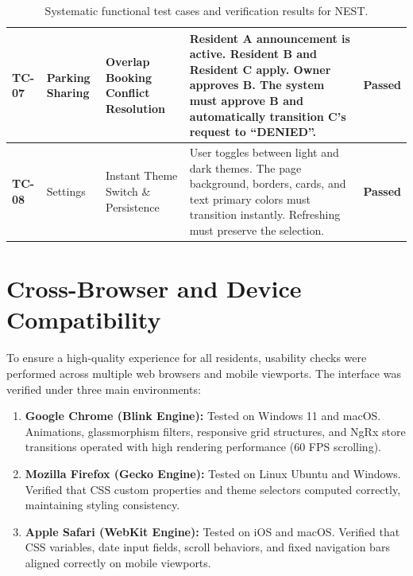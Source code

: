 \begin{table}[htbp]
\begin{tabularx}{\textwidth}{|>{\raggedright\arraybackslash}p{1.0cm}|>{\raggedright\arraybackslash}p{1.8cm}|>{\raggedright\arraybackslash}p{2.8cm}|>{\raggedright\arraybackslash}X|p{1.0cm}|}
\textbf{TC-07} & Parking Sharing & Overlap Booking Conflict Resolution & Resident A announcement is active. Resident B and Resident C apply. Owner approves B. The system must approve B and automatically transition C's request to ``DENIED''. & \textbf{Passed} \\ \hline
\textbf{TC-08} & Settings & Instant Theme Switch \& Persistence & User toggles between light and dark themes. The page background, borders, cards, and text primary colors must transition instantly. Refreshing must preserve the selection. & \textbf{Passed} \\ \hline
\end{tabularx}
\caption{Systematic functional test cases and verification results for NEST.}
\label{tab:test-cases}
\end{table}

\section{Cross-Browser and Device Compatibility}
To ensure a high-quality experience for all residents, usability checks were performed across multiple web browsers and mobile viewports.
The interface was verified under three main environments:
\begin{enumerate}
    \item \textbf{Google Chrome (Blink Engine):} Tested on Windows 11 and macOS. Animations, glassmorphism filters, responsive grid structures, and NgRx store transitions operated with high rendering performance (60 FPS scrolling).
    \item \textbf{Mozilla Firefox (Gecko Engine):} Tested on Linux Ubuntu and Windows. Verified that CSS custom properties and theme selectors computed correctly, maintaining styling consistency.
    \item \textbf{Apple Safari (WebKit Engine):} Tested on iOS and macOS. Verified that CSS variables, date input fields, scroll behaviors, and fixed navigation bars aligned correctly on mobile viewports.
\end{enumerate}

